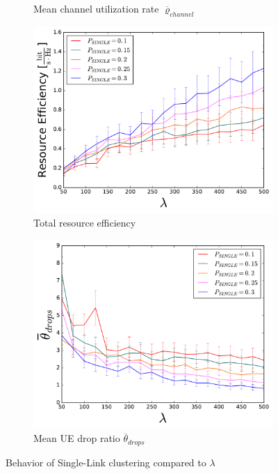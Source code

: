 \begin{figure}
\begin{subfigure}[b]{0.5\linewidth}
    \caption{Mean channel utilization rate $\overline{\varrho}_{channel}$} 
    \label{fig:SINGLELINES_8} 
    \vspace{4ex}
  \end{subfigure} 
  \begin{subfigure}[b]{0.5\linewidth}
    \centering
    \captionsetup{justification=centering}
    \includegraphics[width=1\linewidth]{figures/SINGLELINES_9} 
    \caption{Total resource efficiency} 
    \label{fig:SINGLELINES_9} 
  \end{subfigure}%
  \begin{subfigure}[b]{0.5\linewidth}
    \centering
    \captionsetup{justification=centering}
    \includegraphics[width=1\linewidth]{figures/SINGLELINES_10} 
    \caption{Mean UE drop ratio $\overline{\theta}_{drops}$} 
    \label{fig:SINGLELINES_10} 
  \end{subfigure} 
  \caption{Behavior of Single-Link clustering compared to $\lambda$}
  \label{fig:pretty_results_SINGLE} 
\end{figure}

